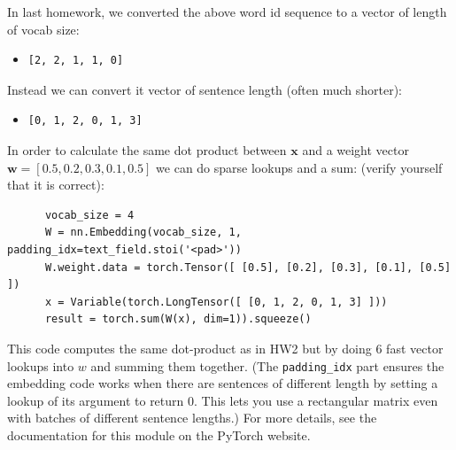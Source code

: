 \documentclass[10pt]{harvardml}
\theoremstyle{plain}
\begin{document}
In last homework, we converted the above word id sequence to a vector of length of vocab size:
\begin{itemize}
\item \begin{verbatim}[2, 2, 1, 1, 0]\end{verbatim}
\end{itemize}


Instead we can convert it vector of sentence length (often much shorter):
\begin{itemize}
\item \begin{verbatim}[0, 1, 2, 0, 1, 3]\end{verbatim}
\end{itemize}

\noindent In order to calculate the same dot product between $\mathbf{x}$ and a weight vector $\mathbf{w}=[0.5,0.2,0.3,0.1,0.5]$ we can do sparse lookups and a sum:
(verify yourself that it is correct):
  \begin{verbatim}
      vocab_size = 4
      W = nn.Embedding(vocab_size, 1, padding_idx=text_field.stoi('<pad>'))
      W.weight.data = torch.Tensor([ [0.5], [0.2], [0.3], [0.1], [0.5] ])
      x = Variable(torch.LongTensor([ [0, 1, 2, 0, 1, 3] ]))
      result = torch.sum(W(x), dim=1)).squeeze()
  \end{verbatim}

This code computes the same dot-product as in HW2 but by doing 6 fast vector lookups
into $w$ and summing them together. (The \texttt{padding\_idx} part ensures
the embedding code works when there are sentences of different length by setting
a lookup of its argument to return 0. This lets you use a rectangular matrix even
with batches of different sentence lengths.) For more details, see the documentation for this module on the PyTorch website.
\end{document}
